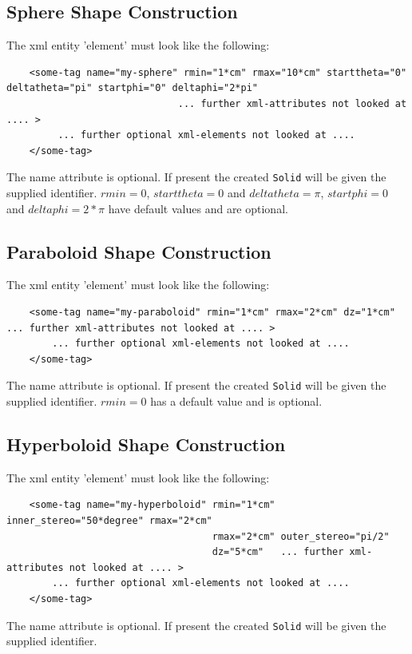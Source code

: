 \subsection{Sphere Shape Construction}
\label{sec:dd4hep-manual-plugin-sphere-shape}

The xml entity 'element' must look like the following:
\begin{verbatim}
    <some-tag name="my-sphere" rmin="1*cm" rmax="10*cm" starttheta="0" deltatheta="pi" startphi="0" deltaphi="2*pi"
                              ... further xml-attributes not looked at .... >
         ... further optional xml-elements not looked at .... 
    </some-tag>
\end{verbatim}
The name attribute is optional. If present the created \texttt{Solid} will be given the supplied identifier.
$rmin=0$, $starttheta=0$ and $deltatheta=\pi$, $startphi=0$ and $deltaphi=2*\pi$ have default values and are optional.

\subsection{Paraboloid Shape Construction}
\label{sec:dd4hep-manual-plugin-paraboloid-shape}

The xml entity 'element' must look like the following:
\begin{verbatim}
    <some-tag name="my-paraboloid" rmin="1*cm" rmax="2*cm" dz="1*cm" ... further xml-attributes not looked at .... >
        ... further optional xml-elements not looked at .... 
    </some-tag>
 \end{verbatim}
The name attribute is optional. If present the created \texttt{Solid} will be given the supplied identifier.
$rmin=0$ has a default value and is optional.

\subsection{Hyperboloid Shape Construction}
\label{sec:dd4hep-manual-plugin-hyperboloid-shape}

The xml entity 'element' must look like the following:
\begin{verbatim}
    <some-tag name="my-hyperboloid" rmin="1*cm" inner_stereo="50*degree" rmax="2*cm"
                                    rmax="2*cm" outer_stereo="pi/2"
                                    dz="5*cm"   ... further xml-attributes not looked at .... >
        ... further optional xml-elements not looked at .... 
    </some-tag>
 \end{verbatim}
The name attribute is optional. If present the created \texttt{Solid} will be given the supplied identifier.

